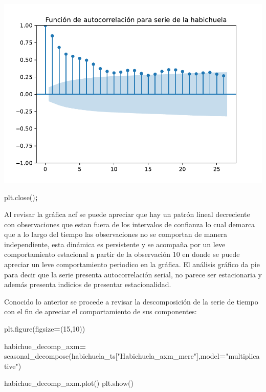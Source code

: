 \documentclass[
]{book}
\newenvironment{Shaded}{\begin{snugshade}}{\end{snugshade}}
\newcommand{\DecValTok}[1]{\textcolor[rgb]{0.00,0.00,0.81}{#1}}
\newcommand{\NormalTok}[1]{#1}
\newcommand{\OperatorTok}[1]{\textcolor[rgb]{0.81,0.36,0.00}{\textbf{#1}}}
\newcommand{\StringTok}[1]{\textcolor[rgb]{0.31,0.60,0.02}{#1}}
\begin{document}
\includegraphics{bookdown-demo_files/figure-latex/unnamed-chunk-67-33.pdf}

\begin{Shaded}
\begin{Highlighting}[]
\NormalTok{plt.close()}\OperatorTok{;}
\end{Highlighting}
\end{Shaded}

Al revisar la gráfica acf se puede apreciar que hay un patrón lineal decreciente con observaciones que estan fuera de los intervalos de confianza lo cual demarca que a lo largo del tiempo las observaciones no se comportan de manera independiente, esta dinámica es persistente y se acompaña por un leve comportamiento estacional a partir de la observación 10 en donde se puede apreciar un leve comportamiento periodico en la gráfica. El análisis gráfico da pie para decir que la serie presenta autocorrelación serial, no parece ser estacionaria y además presenta indicios de presentar estacionalidad.

Conocido lo anterior se procede a revisar la descomposición de la serie de tiempo con el fin de apreciar el comportamiento de sus componentes:

\begin{Shaded}
\begin{Highlighting}[]

\NormalTok{plt.figure(figsize}\OperatorTok{=}\NormalTok{(}\DecValTok{15}\NormalTok{,}\DecValTok{10}\NormalTok{))}

\NormalTok{habichue\_decomp\_axm}\OperatorTok{=}\NormalTok{ seasonal\_decompose(habichuela\_ts[}\StringTok{"Habichuela\_axm\_merc"}\NormalTok{],model}\OperatorTok{=}\StringTok{"multiplicative"}\NormalTok{)}

\NormalTok{habichue\_decomp\_axm.plot()}
\NormalTok{plt.show()}
\end{Highlighting}
\end{Shaded}
\end{document}
